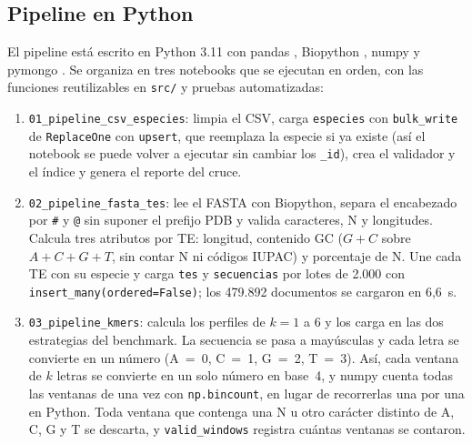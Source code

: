 \documentclass[unnumsec,namedate,webpdf,contemporary,large]{oup-authoring-template}
\begin{document}
\subsection{Pipeline en Python}

El pipeline est\'a escrito en Python 3.11 con pandas \citep{mckinney2010pandas}, Biopython \citep{cock2009biopython}, numpy \citep{harris2020numpy} y pymongo \citep{pymongo}. Se organiza en tres notebooks que se ejecutan en orden, con las funciones reutilizables en \texttt{src/} y pruebas automatizadas:
\begin{enumerate}
\item \texttt{01\_pipeline\_csv\_especies}: limpia el CSV, carga \texttt{especies} con \texttt{bulk\_write} de \texttt{ReplaceOne} con \texttt{upsert}, que reemplaza la especie si ya existe (as\'i el notebook se puede volver a ejecutar sin cambiar los \texttt{\_id}), crea el validador y el \'indice y genera el reporte del cruce.
\item \texttt{02\_pipeline\_fasta\_tes}: lee el FASTA con Biopython, separa el encabezado por \texttt{\#} y \texttt{@} sin suponer el prefijo PDB y valida caracteres, N y longitudes. Calcula tres atributos por TE: longitud, contenido GC ($G + C$ sobre $A + C + G + T$, sin contar N ni c\'odigos IUPAC) y porcentaje de N. Une cada TE con su especie y carga \texttt{tes} y \texttt{secuencias} por lotes de 2.000 con \texttt{insert\_many(ordered=False)}; los 479.892 documentos se cargaron en 6,6~s.
\item \texttt{03\_pipeline\_kmers}: calcula los perfiles de $k = 1$ a 6 y los carga en las dos estrategias del benchmark. La secuencia se pasa a may\'usculas y cada letra se convierte en un n\'umero (A~=~0, C~=~1, G~=~2, T~=~3). As\'i, cada ventana de $k$ letras se convierte en un solo n\'umero en base~4, y numpy cuenta todas las ventanas de una vez con \texttt{np.bincount}, en lugar de recorrerlas una por una en Python. Toda ventana que contenga una N u otro car\'acter distinto de A, C, G y T se descarta, y \texttt{valid\_windows} registra cu\'antas ventanas se contaron.
\end{enumerate}
\end{document}

